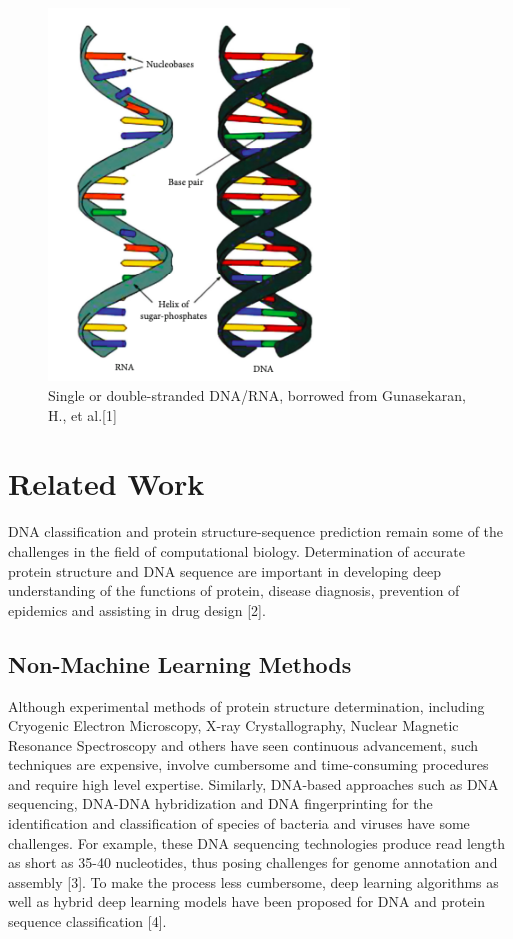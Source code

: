 \documentclass[journal]{IEEEtran}
\begin{document}
  \begin{figure}
    \centering
    \includegraphics[width=8cm]{figures/dna.png}
    \caption{Single or double-stranded DNA/RNA, borrowed from Gunasekaran, H., et al.[1]}
  \end{figure}

\section{Related Work}
  DNA classification and protein structure-sequence prediction remain some of the challenges in the field of computational biology.
  Determination of accurate protein structure and DNA sequence are important in developing deep understanding of the functions of protein,
  disease diagnosis, prevention of epidemics and assisting in drug design [2].
  \subsection{Non-Machine Learning Methods}

    Although experimental methods of protein structure determination, including Cryogenic Electron Microscopy,
    X-ray Crystallography, Nuclear Magnetic Resonance Spectroscopy and others have seen continuous advancement,
    such techniques are expensive, involve cumbersome and time-consuming procedures and require high level expertise.
    Similarly, DNA-based approaches such as DNA sequencing, DNA-DNA hybridization and DNA fingerprinting for the identification
    and classification of species of bacteria and viruses have some challenges. For example, these DNA sequencing technologies
    produce read length as short as 35-40 nucleotides, thus posing challenges for genome annotation and assembly [3].
    To make the process less cumbersome, deep learning algorithms as well as hybrid deep learning models have been proposed
    for DNA and protein sequence classification [4].
\end{document}
